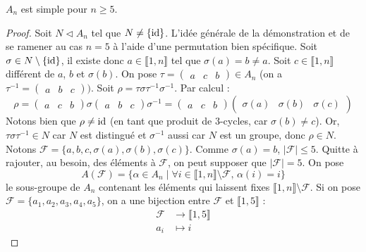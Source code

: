   \begin{theorem}
    $A_n$ est simple pour $n \geq 5$.
  \end{theorem}

  \begin{proof}
    Soit $N \lhd A_n$ tel que $N \neq \{ \operatorname{id} \}$. L'idée générale de la démonstration et de se ramener au cas $n = 5$ à l'aide d'une permutation bien spécifique.
    \newpar
    Soit $\sigma \in N \setminus \{ \operatorname{id} \}$, il existe donc $a \in \llbracket 1, n \rrbracket$ tel que $\sigma(a) = b \neq a$. Soit $c \in \llbracket 1, n \rrbracket$ différent de $a$, $b$ et $\sigma(b)$. On pose $\tau = \begin{pmatrix} a & c & b \end{pmatrix} \in A_n$ (on a $\tau^{-1} = \begin{pmatrix} a & b & c \end{pmatrix})$. Soit $\rho = \tau \sigma \tau^{-1} \sigma^{-1}$. Par calcul :
    \[ \rho = \begin{pmatrix} a & c & b \end{pmatrix} \sigma \begin{pmatrix} a & b & c \end{pmatrix} \sigma^{-1} = \begin{pmatrix} a & c & b \end{pmatrix} \begin{pmatrix} \sigma(a) & \sigma(b) & \sigma(c) \end{pmatrix} \]
    Notons bien que $\rho \neq \operatorname{id}$ (en tant que produit de $3$-cycles, car $\sigma(b) \neq c$). Or, $\tau \sigma \tau^{-1} \in N$ car $N$ est distingué et $\sigma^{-1}$ aussi car $N$ est un groupe, donc $\rho \in N$.
    \newpar
    Notons $\mathcal{F} = \{ a, b, c, \sigma(a), \sigma(b), \sigma(c) \}$. Comme $\sigma(a) = b$, $|\mathcal{F}| \leq 5$. Quitte à rajouter, au besoin, des éléments à $\mathcal{F}$, on peut supposer que $|\mathcal{F}| = 5$. On pose
    \[ A(\mathcal{F}) = \{ \alpha \in A_n \mid \forall i \in \llbracket 1, n \rrbracket \setminus \mathcal{F}, \, \alpha(i) = i \} \]
    le sous-groupe de $A_n$ contenant les éléments qui laissent fixes $\llbracket 1, n \rrbracket \setminus \mathcal{F}$. Si on pose $\mathcal{F} = \{ a_1, a_2, a_3, a_4, a_5 \}$, on a une bijection entre $\mathcal{F}$ et $\llbracket 1, 5 \rrbracket$ :
    \begin{align*}
      \mathcal{F} &\rightarrow \llbracket 1, 5 \rrbracket \\
      a_i &\mapsto i
    \end{align*}

\end{proof}
